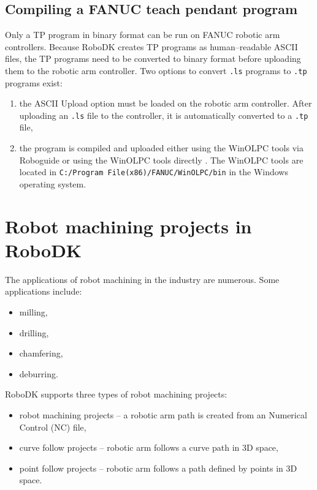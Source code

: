 \subsection{Compiling a FANUC teach pendant program}

Only a TP program in binary format can be run on FANUC robotic arm controllers. Because RoboDK creates TP programs as human--readable ASCII files, the TP programs need to be converted to binary format before uploading them to the robotic arm controller. Two options to convert \texttt{.ls} programs to \texttt{.tp} programs exist:

\begin{enumerate}
\item the ASCII Upload option must be loaded on the robotic arm controller. After uploading an \texttt{.ls} file to the controller, it is automatically converted to a \texttt{.tp} file,
\item the program is compiled and uploaded either using the WinOLPC  tools via Roboguide or using the WinOLPC tools directly \cite{fanuchandling}. The WinOLPC tools are located in \texttt{C:/Program File(x86)/FANUC/WinOLPC/bin} in the Windows operating system.

\end{enumerate}

\section{Robot machining projects in RoboDK}

The applications of robot machining in the industry are numerous. Some applications include:

\begin{itemize}

    \item milling,
    \item drilling,
    \item chamfering,
    \item deburring.

\end{itemize}

RoboDK supports three types of robot machining projects:

\begin{itemize}

    \item robot machining projects -- a robotic arm path is created from an Numerical Control (NC) file,
    \item curve follow projects -- robotic arm follows a curve path in 3D space, 
    \item point follow projects -- robotic arm follows a path defined by points in 3D space.

\end{itemize}

